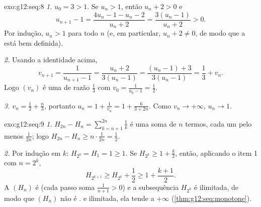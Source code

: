 \begin{solution}{exo:g12:seq:8}
\emph{1.} $u_0 = 3 > 1$. Se $u_n > 1$, então $u_n + 2 > 0$ e
\[
u_{n+1} - 1 = \frac{4u_n - 1 - u_n - 2}{u_n + 2} = \frac{3(u_n - 1)}{u_n + 2} > 0 .
\]
Por indução, $u_n > 1$ para todo $n$ (e, em particular,
$u_n + 2 \neq 0$, de modo que a  está bem definida).

\emph{2.} Usando a identidade acima,
\[
v_{n+1} = \frac{1}{u_{n+1} - 1} = \frac{u_n + 2}{3(u_n - 1)}
= \frac{(u_n - 1) + 3}{3(u_n - 1)} = \frac{1}{3} + v_n .
\]
Logo $(v_n)$ é uma  de razão $\frac13$ com
$v_0 = \frac{1}{u_0 - 1} = \frac12$.

\emph{3.} $v_n = \frac12 + \frac{n}{3}$, portanto
$u_n = 1 + \frac{1}{v_n} = 1 + \frac{6}{3 + 2n}$. Como
$v_n \to +\infty$, $u_n \to 1$.
\end{solution}

\begin{solution}{exo:g12:seq:9}
\emph{1.} $H_{2n} - H_n = \sum_{k=n+1}^{2n} \frac{1}{k}$ é uma soma de
$n$ termos, cada um pelo menos $\frac{1}{2n}$; logo
$H_{2n} - H_n \geq n \cdot \frac{1}{2n} = \frac12$.

\emph{2.} Por indução em $k$: $H_{2^0} = H_1 = 1 \geq 1$. Se
$H_{2^k} \geq 1 + \frac{k}{2}$, então, aplicando o item 1 com $n = 2^k$,
\[
H_{2^{k+1}} \geq H_{2^k} + \frac12 \geq 1 + \frac{k+1}{2}.
\]
A  $(H_n)$ é  (cada passo soma $\frac{1}{n+1} > 0$) e a
subsequência $H_{2^k}$ é ilimitada, de modo que $(H_n)$ não é .  e ilimitada, ela tende a $+\infty$
(\cref{thm:g12:seq:monotone}).
\end{solution}

